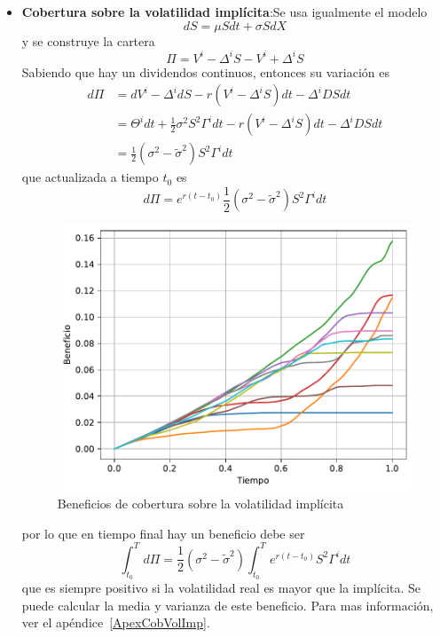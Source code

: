 \begin{itemize}
    \item \textbf{Cobertura sobre la volatilidad implícita}:Se usa igualmente el modelo
    \[
        dS = \mu S dt + \sigma S dX
    \]
    y se construye la cartera
    \[
        \Pi = V^i-\Delta^i S-V^i + \Delta^i S
    \]
    Sabiendo que hay un dividendos continuos, entonces su variación es
    \begin{align*}
        d\Pi &= dV^i - \Delta^i dS - r(V^i - \Delta^i S)dt - \Delta^i D S dt \\
        &= \Theta^i dt + \frac{1}{2} \sigma^2 S^2 \Gamma^i dt - r(V^i - \Delta^i S)dt - \Delta^i D S dt \\
        &= \frac{1}{2}(\sigma^2 - \tilde{\sigma}^2)S^2 \Gamma^i dt
    \end{align*}
    que actualizada a tiempo $t_0$ es
    \[ 
        d\Pi = e^{r(t-t_0)}\frac{1}{2}(\sigma^2 - \tilde{\sigma}^2)S^2 \Gamma^i dt
    \]
    \begin{figure}[H]
        \centering
        \includegraphics[width=0.65\linewidth]{Imagenes/Parte1/10_Cobertura/Cobertura_Volat_Imp.pdf}
        \caption{Beneficios de cobertura sobre la volatilidad implícita}
    \end{figure}
    por lo que en tiempo final hay un beneficio debe ser
    \[
        \boxed{\int_{t_0}^T d\Pi = \frac{1}{2}(\sigma^2 - \tilde{\sigma}^2) \int_{t_0}^T e^{r(t-t_0)}S^2 \Gamma^i dt}
    \]
    que es siempre positivo si la volatilidad real es mayor que la implícita. Se puede calcular la media y varianza de este beneficio. Para mas información, ver el apéndice~\ref{ApexCobVolImp}.


\end{itemize}
